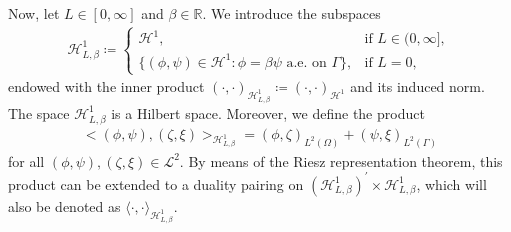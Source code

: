 \documentclass[10pt,reqno]{amsart}
\theoremstyle{remark}
\numberwithin{equation}{section}
\newcommand{\ang}[2]{ \langle #1 , #2  \rangle}
\newcommand{\bigang}[2]{ \big< #1 , #2  \big>}
\newcommand{\scp}[2]{ ( #1 , #2  )}
\newcommand{\R}{\mathbb R}
\newcommand{\Om}{\Omega}
\newcommand{\Ga}{\Gamma}
\begin{document}
Now, let $L\in[0,\infty]$ and $\beta\in\R$. We introduce the subspaces
\begin{align*}
	\mathcal{H}^1_{L,\beta} \coloneqq \begin{cases}
	\mathcal{H}^1, &\text{if~} L\in(0,\infty], \\
	\big\{(\phi,\psi)\in\mathcal{H}^1: \phi = \beta\psi \text{~a.e. on~}\Ga\big\}, &\text{if~} L = 0,
	\end{cases}
\end{align*}
endowed with the inner product $\scp{\cdot}{\cdot}_{\mathcal{H}^1_{L,\beta}} \coloneqq \scp{\cdot}{\cdot}_{\mathcal{H}^1}$ and its induced norm. The space $\mathcal{H}^1_{L,\beta}$ is a Hilbert space. Moreover, we define the product
\begin{align*}
	\bigang{\scp{\phi}{\psi}}{\scp{\zeta}{\xi}}_{\mathcal{H}^1_{L,\beta}} = \scp{\phi}{\zeta}_{L^2(\Om)} + \scp{\psi}{\xi}_{L^2(\Ga)}
\end{align*}
for all $(\phi,\psi), (\zeta,\xi)\in\mathcal{L}^2$. By means of the Riesz representation theorem, this product can be extended to a duality pairing on $(\mathcal{H}^1_{L,\beta})^\prime\times\mathcal{H}^1_{L,\beta}$, which will also be denoted as $\ang{\cdot}{\cdot}_{\mathcal{H}^1_{L,\beta}}$. 
\end{document}
